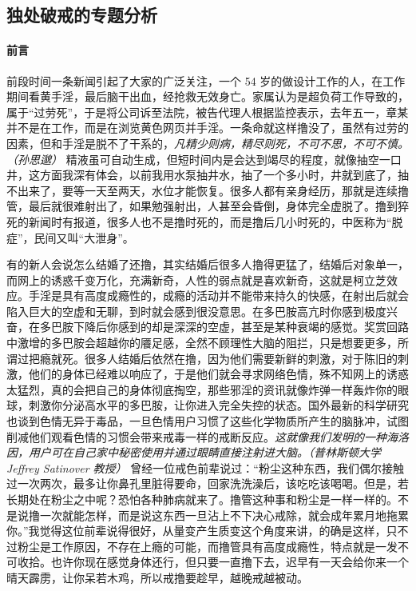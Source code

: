 \subsection{独处破戒的专题分析}\label{103}

\paragraph*{前言}

前段时间一条新闻引起了大家的广泛关注，一个 54 岁的做设计工作的人，在工作期间看黄手淫，最后脑干出血，经抢救无效身亡。家属认为是超负荷工作导致的，属于“过劳死”，于是将公司诉至法院，被告代理人根据监控表示，去年五一，章某并不是在工作，而是在浏览黄色网页并手淫。一条命就这样撸没了，虽然有过劳的因素，但和手淫是脱不了干系的，\textit{凡精少则病，精尽则死，不可不思，不可不慎。（孙思邈）} 精液虽可自动生成，但短时间内是会达到竭尽的程度，就像抽空一口井，这方面我深有体会，以前我用水泵抽井水，抽了一个多小时，井就到底了，抽不出来了，要等一天至两天，水位才能恢复。很多人都有亲身经历，那就是连续撸管，最后就很难射出了，如果勉强射出，人甚至会昏倒，身体完全虚脱了。撸到猝死的新闻时有报道，很多人也不是撸时死的，而是撸后几小时死的，中医称为“脱症”，民间又叫“大泄身”。

有的新人会说怎么结婚了还撸，其实结婚后很多人撸得更猛了，结婚后对象单一，而网上的诱惑千变万化，充满新奇，人性的弱点就是喜欢新奇，这就是柯立芝效应。手淫是具有高度成瘾性的，成瘾的活动并不能带来持久的快感，在射出后就会陷入巨大的空虚和无聊，到时就会感到很没意思。在多巴胺高亢时你感到极度兴奋，在多巴胺下降后你感到的却是深深的空虚，甚至是某种衰竭的感觉。奖赏回路中激增的多巴胺会超越你的餍足感，全然不顾理性大脑的阻拦，只是想要更多，所谓过把瘾就死。很多人结婚后依然在撸，因为他们需要新鲜的刺激，对于陈旧的刺激，他们的身体已经难以响应了，于是他们就会寻求网络色情，殊不知网上的诱惑太猛烈，真的会把自己的身体彻底掏空，那些邪淫的资讯就像炸弹一样轰炸你的眼球，刺激你分泌高水平的多巴胺，让你进入完全失控的状态。国外最新的科学研究也谈到色情无异于毒品，一旦色情用户习惯了这些化学物质所产生的脑脉冲，试图削减他们观看色情的习惯会带来戒毒一样的戒断反应。\textit{这就像我们发明的一种海洛因，用户可在自己家中秘密使用并通过眼睛直接注射进大脑。（普林斯顿大学 Jeffrey Satinover 教授）} 曾经一位戒色前辈说过：“粉尘这种东西，我们偶尔接触过一次两次，最多让你鼻孔里脏得要命，回家洗洗澡后，该吃吃该喝喝。但是，若长期处在粉尘之中呢？恐怕各种肺病就来了。撸管这种事和粉尘是一样一样的。不是说撸一次就能怎样，而是说这东西一旦沾上不下决心戒除，就会成年累月地拖累你。”我觉得这位前辈说得很好，从量变产生质变这个角度来讲，的确是这样，只不过粉尘是工作原因，不存在上瘾的可能，而撸管具有高度成瘾性，特点就是一发不可收拾。也许你现在感觉身体还行，但只要一直撸下去，迟早有一天会给你来一个晴天霹雳，让你呆若木鸡，所以戒撸要趁早，越晚戒越被动。

